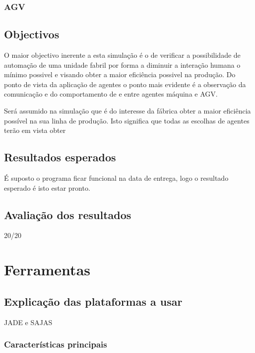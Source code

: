 \begin{titlepage}
\subsubsection{AGV}


\subsection{Objectivos}
\justify\normalsize
O maior objectivo inerente a esta simulação é o de verificar a possibilidade de automação de uma unidade fabril por forma a diminuir a interação humana o mínimo possivel e visando obter a maior eficiência possivel na produção. Do ponto de vista da aplicação de agentes o ponto mais evidente é a observação da comunicação e do comportamento de e entre agentes máquina e AGV. 

Será assumido na simulação que é do interesse da fábrica obter a maior eficiência possível na sua linha de produção. Isto significa que todas as escolhas de agentes terão em vista obter 


\subsection{Resultados esperados}
\justify\normalsize
É suposto o programa ficar funcional na data de entrega, logo o resultado esperado é isto estar pronto.

\subsection{Avaliação dos resultados}
\justify\normalsize
20/20



\section{Ferramentas}

\subsection{Explicação das plataformas a usar}
JADE e SAJAS

\subsubsection{Características principais}



\end{titlepage}
